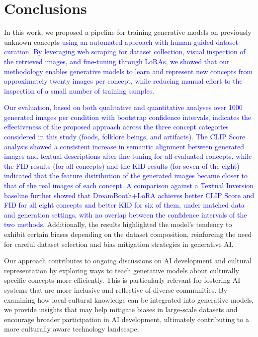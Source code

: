 \documentclass[pdflatex,sn-mathphys-num]{sn-jnl}%
\theoremstyle{thmstyleone}%
\theoremstyle{thmstyletwo}%
\theoremstyle{thmstylethree}%
\begin{document}
\section{Conclusions}
\label{conclusions}

In this work, we proposed a pipeline for training generative models on previously unknown concepts \textcolor{blue}{using an automated approach with human-guided dataset curation. By leveraging web scraping for dataset collection, visual inspection of the retrieved images, and fine-tuning through LoRAs, we showed that our methodology enables generative models to learn and represent new concepts from approximately twenty images per concept, while reducing manual effort to the inspection of a small number of training samples.} 

\textcolor{blue}{Our evaluation, based on both qualitative and quantitative analyses over 1000 generated images per condition with bootstrap confidence intervals, indicates the effectiveness of the proposed approach across the three concept categories considered in this study (foods, folklore beings, and artifacts). The CLIP Score analysis showed a consistent increase in semantic alignment between generated images and textual descriptions after fine-tuning for all evaluated concepts, while the FID results (for all concepts) and the KID results (for seven of the eight) indicated that the feature distribution of the generated images became closer to that of the real images of each concept. A comparison against a Textual Inversion baseline further showed that DreamBooth+LoRA achieves better CLIP Score and FID for all eight concepts and better KID for six of them, under matched data and generation settings, with no overlap between the confidence intervals of the two methods.} Additionally, the results highlighted the model's tendency to exhibit certain biases depending on the dataset composition, reinforcing the need for careful dataset selection and bias mitigation strategies in generative AI.

Our approach contributes to ongoing discussions on AI development and cultural representation by exploring ways to teach generative models about culturally specific concepts more efficiently. This is particularly relevant for fostering AI systems that are more inclusive and reflective of diverse communities. By examining how local cultural knowledge can be integrated into generative models, we provide insights that may help mitigate biases in large-scale datasets and encourage broader participation in AI development, ultimately contributing to a more culturally aware technology landscape.
\end{document}
